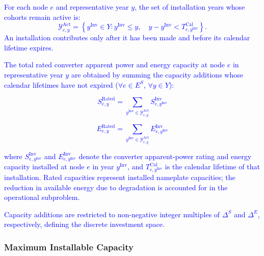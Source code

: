\documentclass[preprint,12pt]{elsarticle}
\begin{document}
\textcolor{blue}{
    For each node $e$ and representative year $y$, the set of
    installation years whose cohorts remain active is:
    \begin{equation}
        \mathcal{Y}^{\text{Act}}_{e,y}
        =
        \left\{
            y^{\text{Inv}}\in Y :
            y^{\text{Inv}}\le y,\quad
            y-y^{\text{Inv}}<
            T^{\text{Cal}}_{e,y^{\text{Inv}}}
        \right\}.
        \label{eq:active_cohorts}
    \end{equation}
    An installation contributes only after it has been made
    and before its calendar lifetime expires.
}

\textcolor{blue}{
    The total rated converter apparent power and energy capacity at node $e$ in representative year $y$ are obtained by summing the capacity additions whose calendar lifetimes have not expired ($\forall e\in E^S$, $\forall y\in Y$):
}

\textcolor{blue}{
    \begin{equation}
        S^{\text{Rated}}_{e,y}
        =
        \sum_{y^{\text{Inv}}\in\mathcal{Y}^{\text{Act}}_{e,y}}
        S^{\text{Inv}}_{e,y^{\text{Inv}}}
        \label{eq:master_rated_s}
    \end{equation}
}

\textcolor{blue}{
    \begin{equation}
        E^{\text{Rated}}_{e,y}
        =
        \sum_{y^{\text{Inv}}\in\mathcal{Y}^{\text{Act}}_{e,y}}
        E^{\text{Inv}}_{e,y^{\text{Inv}}}
    \end{equation}
}

\noindent
\textcolor{blue}{
    where 
    $S^{\text{Inv}}_{e,y^{\text{Inv}}}$ and $E^{\text{Inv}}_{e,y^{\text{Inv}}}$ denote the converter apparent-power rating and energy capacity installed at node $e$ in year $y^{\text{Inv}}$, and
    $T^{\text{Cal}}_{e,y^{\text{Inv}}}$ is the calendar lifetime of that installation. 
    Rated capacities represent installed nameplate capacities; the reduction in available energy due to degradation is accounted for in the operational subproblem.
}

\textcolor{blue}{
    Capacity additions are restricted to non-negative integer multiples of $\Delta^S$ and $\Delta^E$, respectively, defining the discrete investment space.
}

\subsubsection{Maximum Installable Capacity}
\end{document}
